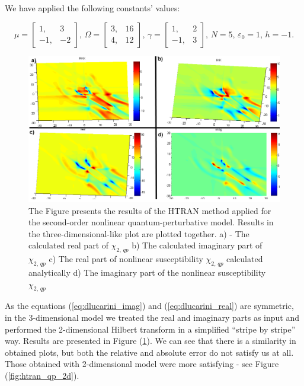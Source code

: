 \documentclass[12pt,twoside,a4paper]{article}
\numberwithin{equation}{subsection}
\numberwithin{figure}{subsection}
\begin{document}
We have applied the following constants' values: 

\begin{equation} \label{eq:htran_qp_constant}
  \mu = \begin{bmatrix}
          1, &  3 \\
         -1, & -2
        \end{bmatrix}, \,
  \Omega = \begin{bmatrix}
          3, & 16 \\
          4, & 12
        \end{bmatrix}, \,
  \gamma = \begin{bmatrix}
          1, & 2 \\
         -1, & 3
        \end{bmatrix}, \,
  N = 5, \,
  \varepsilon_0 = 1, \, 
  h = -1.
\end{equation}

\begin{figure}
  \includegraphics[width=150mm]{img/htran_qp_3d.png}
  \caption{The Figure presents the results of the HTRAN method applied for the second-order nonlinear quantum-perturbative model. Results in the three-dimensional-like plot are plotted together.
     a) - The calculated real part of ${\chi_{2, \, qp}}$ 
     b) The calculated imaginary part of ${\chi_{2, \, qp}}$ 
     c) The real part of nonlinear susceptibility ${\chi_{2, \, qp}}$ calculated analytically 
     d) The imaginary part of the nonlinear susceptibility ${\chi_{2, \, qp}}$
     \label{fig:htran_qp_3d}}
\end{figure}

As the equations (\ref{eq:dlucarini_imag}) and (\ref{eq:dlucarini_real}) are symmetric, in the 3-dimensional model we treated the real and imaginary parts as input and performed the 2-dimensional Hilbert transform in a simplified ``stripe by stripe'' way. Results are presented in Figure (\ref{fig:htran_qp_3d}). We can see that there is a similarity in obtained plots, but both the relative and absolute error do not satisfy us at all. Those obtained with 2-dimensional model were more satisfying - see Figure (\ref{fig:htran_qp_2d}).
\end{document}
